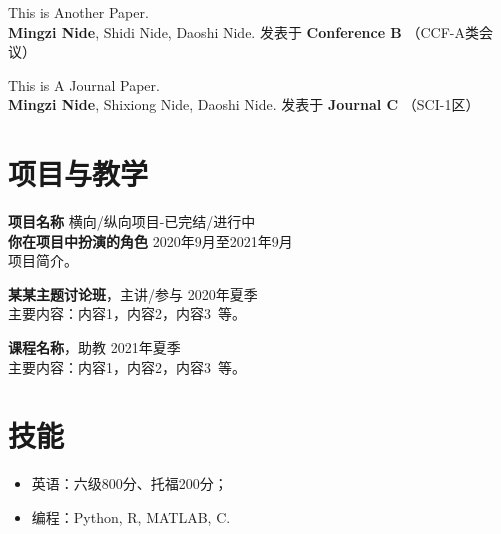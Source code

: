     \vspace{0.5em}
    This is Another Paper. \\
    \textbf{Mingzi Nide}, Shidi Nide, Daoshi Nide. \hfill 
    发表于 \textbf{Conference B} （CCF-A类会议）

    \vspace{0.5em}
    This is A Journal Paper.\\
    \textbf{Mingzi Nide}, Shixiong Nide, Daoshi Nide. \hfill 
    发表于 \textbf{Journal C} （SCI-1区）

    \section{\makebox[\widthof{\faChalkboardTeacher}][c]{\color{WHU_Blue}{\faChalkboardTeacher}}\quad 项目与教学}
    \vspace{0.5em}
    {\large{\textbf{项目名称}}} \hfill {横向/纵向项目-已完结/进行中}\\
    \textbf{你在项目中扮演的角色} \hfill 2020年9月至2021年9月\\
    项目简介。

    \vspace{1em}
    {\large{\textbf{某某主题讨论班}}}，主讲/参与 \hfill {2020年夏季}\\
    主要内容：内容1，内容2，内容3\ 等。
    
    \vspace{1em}
    {\large{\textbf{课程名称}}}，助教 \hfill {2021年夏季}\\
    主要内容：内容1，内容2，内容3\ 等。

    \section{\makebox[\widthof{\faWrench}][c]{\color{WHU_Blue}{\faWrench}}\quad 技能}
    \vspace{0.5em}
    \begin{itemize}
        \item 英语：六级800分、托福200分；
        \item 编程：Python, R, MATLAB, C.
    \end{itemize}
    

    
